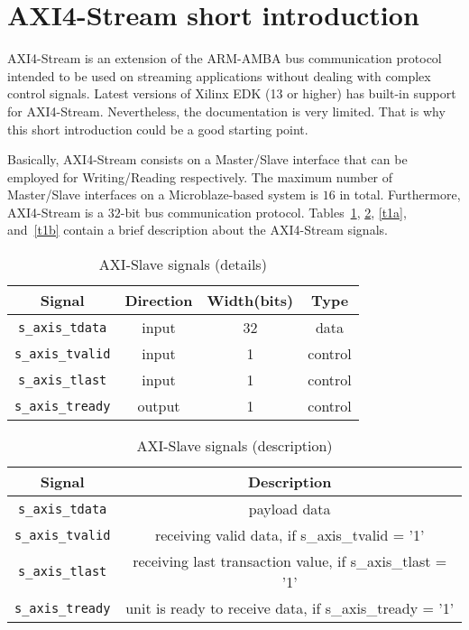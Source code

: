 \section{AXI4-Stream short introduction}

AXI4-Stream is an extension of the ARM-AMBA bus communication protocol intended to be used on streaming applications without dealing with complex control signals. Latest versions of Xilinx EDK (13 or higher) has built-in support for AXI4-Stream. Nevertheless, the documentation is very limited. That is why this short introduction could be a good starting point.

Basically, AXI4-Stream consists on a Master/Slave interface that can be employed for Writing/Reading respectively. The maximum number of Master/Slave interfaces on a Microblaze-based system is $16$ in total. Furthermore, AXI4-Stream is a $32$-bit bus communication protocol. Tables~\ref{t0a}, \ref{t0b}, \ref{t1a}, and~\ref{t1b} contain a brief description about the AXI4-Stream signals.


\begin{table}
    \begin{tabular}{ | c | c | c | c |}
    \hline
Signal & Direction & Width(bits) & Type \\ \hline
{\tt s\_axis\_tdata} & input & 32 &  data \\ \hline
{\tt s\_axis\_tvalid} & input & 1 & control  \\ \hline
{\tt s\_axis\_tlast} & input & 1 & control \\  \hline
{\tt s\_axis\_tready} & output & 1 & control \\ 
    \hline
    \end{tabular}
	\caption{AXI-Slave signals (details)}
    \label{t0a}
\end{table}

\begin{table}
    \begin{tabular}{ | c | c |}
    \hline
Signal & Description \\ \hline
{\tt s\_axis\_tdata} &  payload data \\ \hline
{\tt s\_axis\_tvalid} & receiving valid data, if s\_axis\_tvalid = '1'  \\ \hline
{\tt s\_axis\_tlast} & receiving last transaction value, if s\_axis\_tlast = '1' \\  \hline
{\tt s\_axis\_tready} & unit is ready to receive data, if s\_axis\_tready = '1' \\ 
    \hline
    \end{tabular}
	\caption{AXI-Slave signals (description)}
    \label{t0b}
\end{table}

